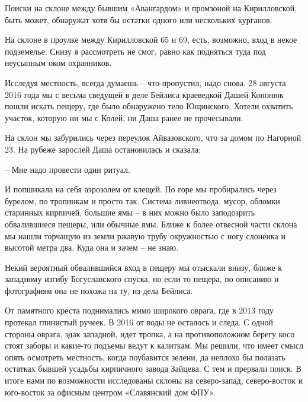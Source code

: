 Поиски на склоне между бывшим «Авангардом» и промзоной на Кирилловской, быть может, обнаружат хотя бы остатки одного или нескольких курганов. %

На склоне в проулке между Кирилловской 65 и 69, есть, возможно, вход в некое подземелье. Снизу я рассмотреть не смог, равно как подняться туда под неусыпным оком охранников.

Исследуя местность, всегда думаешь – что-пропустил, надо снова. 28 августа 2016 года мы с весьма сведущей в деле Бейлиса краеведкой Дашей Кононюк пошли искать пещеру, где было обнаружено тело Ющинского. Хотели охватить участок, которую ни мы с Колей, ни Даша ранее не прочесывали.

На склон мы забурились через переулок Айвазовского, что за домом по Нагорной 23. На рубеже зарослей Даша остановилась и сказала:

   – Мне надо провести один ритуал.

И попшикала на себя аэрозолем от клещей. По горе мы пробирались через бурелом, по тропинкам и просто так. Система ливнеотвода, мусор, обломки старинных кирпичей, большие ямы – в них можно было заподозрить обвалившиеся пещеры, или обычные ямы. Ближе к более отвесной части склона мы нашли торчащую из земли ржавую трубу окружностью с ногу слоненка и высотой метра два. Куда она и зачем – не знаю.

Некий вероятный обвалившийся вход в пещеру мы отыскали внизу, ближе к западному изгибу Богуславского спуска, но если то пещера, по описанию и фотографиям она не похожа на ту, из дела Бейлиса.

От памятного креста поднимались мимо широкого оврага, где в 2013 году протекал глинистый ручеек. В 2016 от воды не осталось и следа. С одной стороны оврага, эдак западной, идет тропка, а на противоположном берегу косо стоят заборы и какие-то подъемы ведут к калиткам. Мы решили, что имеет смысл опять осмотреть местность, когда поубавится зелени, да неплохо бы полазать остатках бывшей усадьбы кирпичного завода Зайцева. С тем и прервали поиск. В итоге нами по возможности исследованы склоны на северо-запад, северо-восток и юго-восток за офисным центром «Славянский дом ФПУ».

